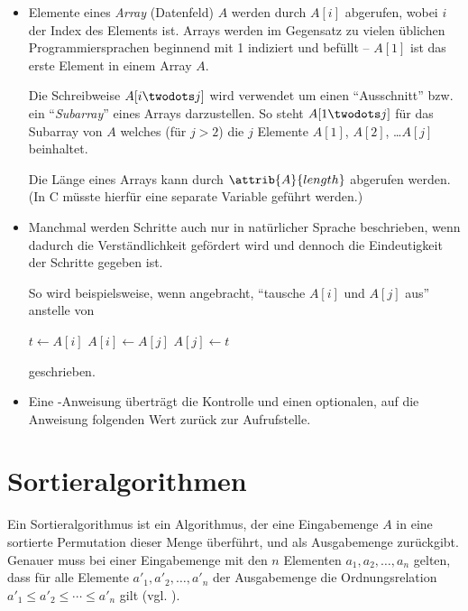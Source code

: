 \begin{itemize}
    \item Elemente eines \emph{Array} (Datenfeld) $A$ werden durch $A[i]$ abgerufen, wobei $i$ der Index des Elements ist. Arrays werden im Gegensatz zu vielen üblichen Pro\-grammier\-sprachen beginnend mit 1 indiziert und befüllt -- $A[1]$ ist das erste Element in einem Array $A$.
    
    Die Schreibweise $A[i \twodots j]$ wird verwendet um einen \enquote{Ausschnitt} bzw. ein \enquote{\emph{Subarray}} eines Arrays darzustellen. So steht $A[1 \twodots j]$ für das Subarray von $A$ welches (für $j > 2$) die $j$ Elemente $A[1]$, $A[2]$, \ldots $A[j]$ beinhaltet.
    
    Die Länge eines Arrays kann durch $\attrib{A}{length}$ abgerufen werden. (In C müsste hierfür eine separate Variable geführt werden.)

    \item Manchmal werden Schritte auch nur in natürlicher Sprache beschrieben, wenn dadurch die Verständlichkeit gefördert wird und dennoch die Eindeutigkeit der Schritte gegeben ist.

    So wird beispielsweise, wenn angebracht, \enquote{tausche $A[i]$ und $A[j]$ aus} anstelle von
    \begin{codebox}
        \li $t \gets A[i]$
        \li $A[i] \gets A[j]$
        \li $A[j] \gets t$
    \end{codebox}
    geschrieben.
    
    \item Eine \Return-Anweisung überträgt die Kontrolle und einen optionalen, auf die Anweisung folgenden Wert zurück zur Aufrufstelle.

\end{itemize}

\section{Sortieralgorithmen}
\label{sec:sorting-algorithms-definition}

Ein Sortieralgorithmus ist ein Algorithmus, der eine Eingabemenge $A$ in eine sortierte Permutation dieser Menge überführt, und als Ausgabemenge zurückgibt. Genauer muss bei einer Eingabemenge mit den $n$ Elementen $a_1, a_2, \ldots, a_n$ gelten, dass für alle Elemente $a'_1, a'_2, \ldots, a'_n$ der Ausgabemenge die Ordnungsrelation $a'_1 \leq a'_2 \leq \cdots \leq a'_n$ gilt (vgl. \cite[4]{taocp3}).

